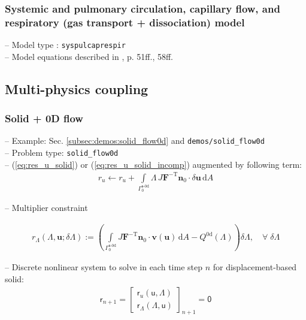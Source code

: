 \documentclass[a4paper,12pt]{report}
\newcommand{\fS}{\text{s}}
\newcommand{\bs}[1]{\boldsymbol{#1}}
\newcommand{\Gm}{\mathit{\Gamma}}
\newcommand{\ROP}{\bs{\mathsf{r}}}
\newcommand{\LMZ}{\bs{\mathsf{\Lambda}}}
\begin{document}
\subsubsection{Systemic and pulmonary circulation, capillary flow, and respiratory (gas transport + dissociation) model}

-- Model type : \verb"syspulcaprespir"\\

-- Model equations described in \cite{hirschvogel2019disspub}, p. 51ff., 58ff.


\subsection{Multi-physics coupling}\label{subsec:multiphys_coupling}

\subsubsection{Solid + 0D flow}\label{subsubsec:solid_flow0d}

-- Example: Sec. \ref{subsec:demos:solid_flow0d} and \verb"demos/solid_flow0d"\\

-- Problem type: \verb"solid_flow0d"\\

-- (\ref{eq:res_u_solid}) or (\ref{eq:res_u_solid_incomp}) augmented by following term:
\begin{align}
r_u \leftarrow r_u + \int\limits_{\Gm_0^{\fS\text{-}\mathrm{0d}}}\!\mathit{\Lambda}\,J\bs{F}^{-\mathrm{T}}\bs{n}_0\cdot\delta\bs{u}\,\mathrm{d}A
\end{align}

-- Multiplier constraint

\begin{align}
r_{\mathit{\Lambda}}(\mathit{\Lambda},\bs{u};\delta\mathit{\Lambda}):= \left(\int\limits_{\Gm_0^{\mathrm{\fS\text{-}0d}}}\! J\bs{F}^{-\mathrm{T}}\bs{n}_{0}\cdot\bs{v}(\bs{u})\,\mathrm{d}A - Q^{\mathrm{0d}}(\mathit{\Lambda})\right) \delta\mathit{\Lambda}, \quad \forall \; \delta\mathit{\Lambda}
\end{align}

-- Discrete nonlinear system to solve in each time step $n$ for displacement-based solid:
\begin{align}
\ROP_{n+1} = \begin{bmatrix} \ROP_{u}(\bs{\mathsf{u}},\LMZ) \\ \ROP_{\mathit{\Lambda}}(\LMZ,\bs{\mathsf{u}}) \end{bmatrix}_{n+1} = \bs{\mathsf{0}}\label{eq:nonlin_sys_solid_0d}
\end{align}
\end{document}
